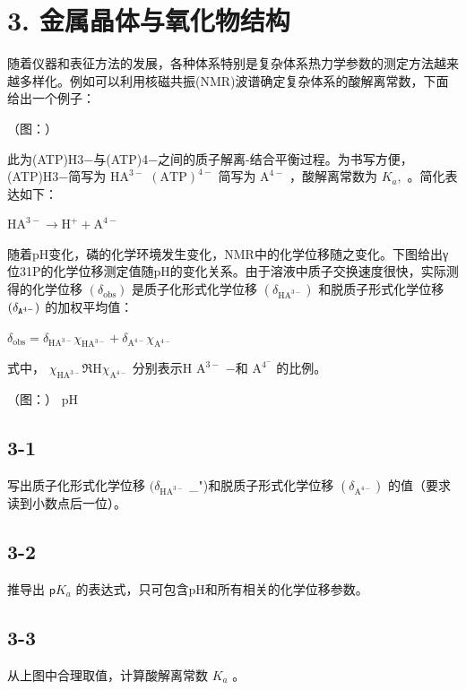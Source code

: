 \section*{3. 金属晶体与氧化物结构}
随着仪器和表征⽅法的发展，各种体系特别是复杂体系热⼒学参数的测定⽅法越来越多样化。例如可以利⽤核磁共振(NMR)波谱确定复杂体系的酸解离常数，下⾯给出⼀个例⼦：

（图：）

此为(ATP)H3−与(ATP)4−之间的质⼦解离-结合平衡过程。为书写⽅便，(ATP)H3−简写为 $\mathrm { H A ^ { 3 - } }$ $\left( \mathrm { A T P } \right) ^ { 4 - }$ 简写为 $\mathrm { A } ^ { 4 - }$ ，酸解离常数为 $K _ { a } ,$ 。简化表达如下：

$
\mathrm{HA} ^ {3 -} \rightarrow \mathrm{H} ^ {+} + \mathrm{A} ^ {4 -}
$

随着pH变化，磷的化学环境发⽣变化，NMR中的化学位移随之变化。下图给出γ位31P的化学位移测定值随pH的变化关系。由于溶液中质⼦交换速度很快，实际测得的化学位移 $( \delta _ { \mathrm { o b s } } )$ 是质⼦化形式化学位移 $( \delta _ { \mathrm { H A } ^ { 3 - } } )$ 和脱质⼦形式化学位移 $\left( { \delta _ { { \tt A } ^ { 4 - } } } \right)$ 的加权平均值：

$
\delta_ {\mathrm{obs}} = \delta_ {\mathrm {HA^ {3 - }}} \chi_ {\mathrm {HA^ {3 -}}} + \delta_ {\mathrm {A^ {4 - }}} \chi_ {\mathrm {A^ {4 - }}}
$

式中， $\chi _ { \mathrm { H A } ^ { 3 - } } \Re \mathrm { H } \chi _ { \mathrm { A } ^ { 4 - } }$ 分别表⽰H $\mathrm { A ^ { 3 - } }$ −和 $\mathrm { A } ^ { 4 ^ { - } }$ 的⽐例。

（图：）
pH

\subsection*{3-1}
写出质⼦化形式化学位移 $( \delta _ { \mathrm { H A } ^ { 3 - } }$ _{"})和脱质⼦形式化学位移 $\left( { \delta _ { \mathrm { { A } } ^ { 4 - } } } \right)$ 的值（要求读到⼩数点后⼀位）。

\subsection*{3-2}
推导出 $\mathsf { p } K _ { a }$ 的表达式，只可包含pH和所有相关的化学位移参数。

\subsection*{3-3}
从上图中合理取值，计算酸解离常数 $K _ { a }$ 。
